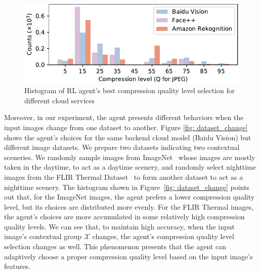 \begin{figure}[htb]
    \includegraphics[width=\linewidth]{figures/quality_chosen.pdf}
    \caption{Histogram of RL agent's best compression quality level selection for different cloud services}
    \label{fig: quality_chosen}
\end{figure}

Moreover, in our experiment, the agent presents different behaviors when the input images change from one dataset to another. Figure \ref{fig: dataset_change} shows the agent's choices for the same backend cloud model (Baidu Vision) but different image datasets. We prepare two datasets indicating two contextual sceneries. We randomly sample images from ImageNet~\cite{ImageNet} whose images are mostly taken in the daytime, to act as a daytime scenery, and randomly select nighttime images from the FLIR Thermal Dataset~\cite{FLIR} to form another dataset to act as a nighttime scenery. The histogram shown in Figure~\ref{fig: dataset_change} points out that, for the ImageNet images, the agent prefers a lower compression quality level, but its choices are distributed more evenly. For the FLIR Thermal images, the agent's choices are more accumulated in some relatively high compression quality levels. We can see that, to maintain high accuracy, when the input image's contextual group $ \mathcal{X} $ changes, the agent's compression quality level selection changes as well. This phenomenon presents that the agent can adaptively choose a proper compression quality level based on the input image's features. %


